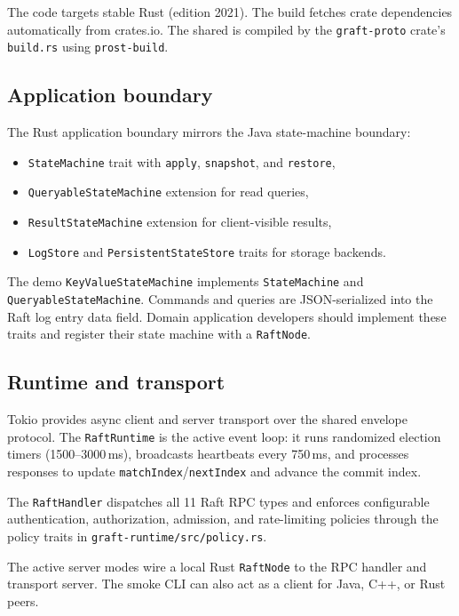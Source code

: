 The code targets stable Rust (edition 2021). The build fetches crate dependencies
automatically from crates.io. The shared 
is compiled by the \texttt{graft-proto} crate's \texttt{build.rs} using
\texttt{prost-build}.

\subsection{Application boundary}

The Rust application boundary mirrors the Java state-machine boundary:

\begin{itemize}
\item \texttt{StateMachine} trait with \texttt{apply}, \texttt{snapshot}, and
\texttt{restore},
\item \texttt{QueryableStateMachine} extension for read queries,
\item \texttt{ResultStateMachine} extension for client-visible results,
\item \texttt{LogStore} and \texttt{PersistentStateStore} traits for storage
backends.
\end{itemize}

The demo \texttt{KeyValueStateMachine} implements \texttt{StateMachine} and
\texttt{QueryableStateMachine}. Commands and queries are JSON-serialized into the
Raft log entry data field. Domain application developers should implement these
traits and register their state machine with a \texttt{RaftNode}.

\subsection{Runtime and transport}

Tokio provides async client and server transport over the shared envelope
protocol. The \texttt{RaftRuntime} is the active event loop: it runs
randomized election timers (1500--3000\,ms), broadcasts heartbeats every 750\,ms,
and processes responses to update \texttt{matchIndex}/\texttt{nextIndex} and
advance the commit index.

The \texttt{RaftHandler} dispatches all 11 Raft RPC types and enforces
configurable authentication, authorization, admission, and rate-limiting policies
through the policy traits in \texttt{graft-runtime/src/policy.rs}.

The active server modes wire a local Rust \texttt{RaftNode} to the RPC handler
and transport server. The smoke CLI can also act as a client for Java, C++, or
Rust peers.

